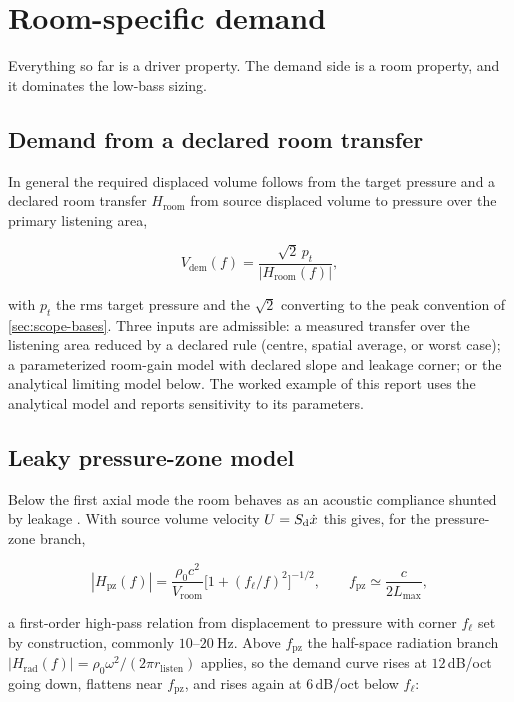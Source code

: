 \section{Room-specific demand}
\label{sec:room}

Everything so far is a driver property. The demand side is a room property,
and it dominates the low-bass sizing.

\subsection{Demand from a declared room transfer}
\label{sec:room-demand}

In general the required displaced volume follows from the target pressure
and a declared room transfer $H_{\mathrm{room}}$ from source displaced
volume to pressure over the primary listening area,

\begin{equation}
	V_{\mathrm{dem}}(f)=\frac{\sqrt2\,p_t}{|H_{\mathrm{room}}(f)|} ,
	\label{eq:demand-general}
\end{equation}

with $p_t$ the rms target pressure and the $\sqrt2$ converting to the peak
convention of \cref{sec:scope-bases}. Three inputs are admissible: a
measured transfer over the listening area reduced by a declared rule (centre,
spatial average, or worst case); a parameterized room-gain model with
declared slope and leakage corner; or the analytical limiting model below.
The worked example of this report uses the analytical model and reports
sensitivity to its parameters.

\subsection{Leaky pressure-zone model}
\label{sec:room-pz}

Below the first axial mode the room behaves as an acoustic compliance
shunted by leakage \cite{beranek2012}. With source volume velocity
$U=S_{\mathrm{d}}\dot x$ this gives, for the pressure-zone branch,

\begin{equation}
	|H_{\mathrm{pz}}(f)|=\frac{\rho_0c^2}{V_{\mathrm{room}}}
		\Big[1+(f_\ell/f)^2\Big]^{-1/2},
	\qquad
	f_{\mathrm{pz}}\simeq\frac{c}{2L_{\max}} ,
	\label{eq:pzdyn}
\end{equation}

a first-order high-pass relation from displacement to pressure with corner
$f_\ell$ set by construction, commonly $10$--$\SI{20}{\hertz}$. Above
$f_{\mathrm{pz}}$ the half-space radiation branch
$|H_{\mathrm{rad}}(f)|=\rho_0\omega^2/(2\pi r_{\mathrm{listen}})$ applies,
so the demand curve rises at $12$\,dB/oct going down, flattens near
$f_{\mathrm{pz}}$, and rises again at $6$\,dB/oct below $f_\ell$:

